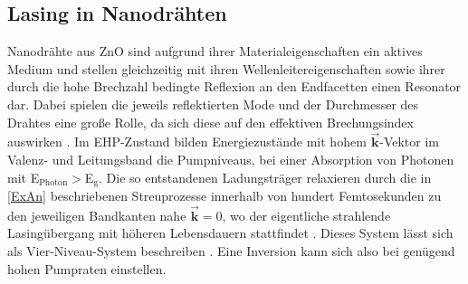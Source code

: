 \subsection{Lasing in Nanodrähten}
Nanodrähte aus ZnO sind aufgrund ihrer Materialeigenschaften ein aktives Medium und stellen gleichzeitig mit ihren Wellenleitereigenschaften sowie ihrer durch die hohe Brechzahl bedingte Reflexion an den Endfacetten einen Resonator dar. Dabei spielen die jeweils reflektierten Mode und der Durchmesser des Drahtes eine große Rolle, da sich diese auf den effektiven Brechungsindex auswirken \cite{Maslov.2003}. Im EHP-Zustand bilden Energiezustände mit hohem $\vec{\textbf{k}}$-Vektor im Valenz- und Leitungsband die Pumpniveaus, bei einer Absorption von Photonen mit E$_{\text{Photon}}>$E$_{\text{g}}$. Die so entstandenen Ladungsträger relaxieren durch die in \autoref{ExAn} beschriebenen Streuprozesse innerhalb von hundert Femtosekunden zu den jeweiligen Bandkanten nahe $\vec{\textbf{k}}=$0, wo der eigentliche strahlende Lasingübergang mit höheren Lebensdauern stattfindet \cite{Kneubuhl.2008}. Dieses System lässt sich als Vier-Niveau-System beschreiben \cite{Geburt.Diss}. Eine Inversion kann sich also bei genügend hohen Pumpraten einstellen. 
